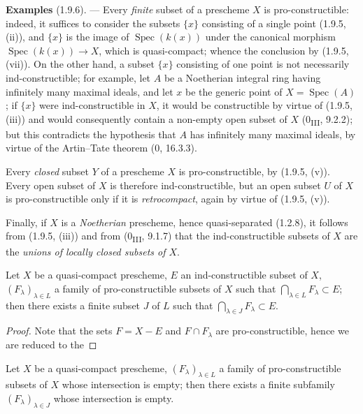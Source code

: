 \begin{env}[1.9.6]
\label{IV.1.9.6}
\textbf{Examples} (1.9.6). --- Every \emph{finite} subset of a prescheme $X$
is pro-constructible: indeed, it suffices to consider the subsets
$\{x\}$ consisting of a single point (1.9.5, (ii)), and $\{x\}$ is the image
of $\operatorname{Spec}(k(x))$ under the canonical morphism
$\operatorname{Spec}(k(x))\to X$, which is quasi-compact; whence the
conclusion by (1.9.5, (vii)). On the other hand, a subset $\{x\}$ consisting
of one point is not necessarily ind-constructible; for example, let $A$ be a
Noetherian integral ring having infinitely many maximal ideals, and let $x$
be the generic point of $X=\operatorname{Spec}(A)$; if $\{x\}$ were
ind-constructible in $X$, it would be constructible by virtue of (1.9.5,
(iii)) and would consequently contain a non-empty open subset of $X$
(0\textsubscript{III}, 9.2.2); but this contradicts the hypothesis that $A$
has infinitely many maximal ideals, by virtue of the Artin--Tate theorem
(0, 16.3.3).

Every \emph{closed} subset $Y$ of a prescheme $X$ is pro-constructible, by
(1.9.5, (v)). Every open subset of $X$ is therefore ind-constructible, but
an open subset $U$ of $X$ is pro-constructible only if it is
\emph{retrocompact}, again by virtue of (1.9.5, (v)).

Finally, if $X$ is a \emph{Noetherian} prescheme, hence quasi-separated
(1.2.8), it follows from (1.9.5, (iii)) and from (0\textsubscript{III}, 9.1.7)
that the ind-constructible subsets of $X$ are the \emph{unions of locally
closed subsets of $X$}.
\end{env}

\begin{theorem}[1.9.7]
\label{IV.1.9.7}
Let $X$ be a quasi-compact prescheme, $E$ an ind-constructible subset of
$X$, $(F_\lambda)_{\lambda\in L}$ a family of pro-constructible subsets
of $X$ such that $\bigcap_{\lambda\in L}F_\lambda\subset E$; then there
exists a finite subset $J$ of $L$ such that
$\bigcap_{\lambda\in J}F_\lambda\subset E$.
\end{theorem}

\begin{proof}
Note that the sets $F=X-E$ and $F\cap F_\lambda$ are
pro-constructible, hence we are reduced to the
\end{proof}

\begin{corollary}[1.9.8]
\label{IV.1.9.8}
Let $X$ be a quasi-compact prescheme, $(F_\lambda)_{\lambda\in L}$ a
family of pro-constructible subsets of $X$ whose intersection is empty;
then there exists a finite subfamily $(F_\lambda)_{\lambda\in J}$ whose
intersection is empty.
\end{corollary}

